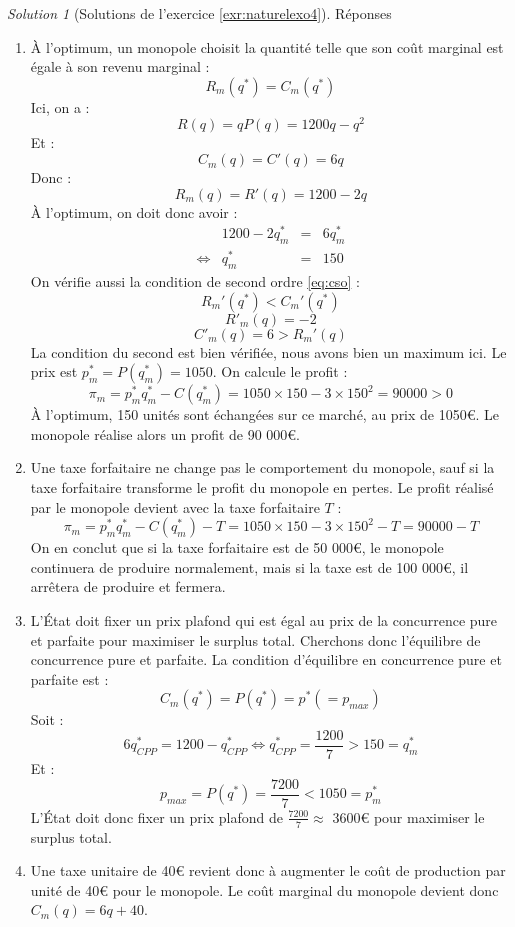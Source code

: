 \documentclass[
]{book}
\providecommand{\tightlist}{%
  \setlength{\itemsep}{0pt}\setlength{\parskip}{0pt}}
\theoremstyle{definition}
\theoremstyle{definition}
\theoremstyle{definition}
\theoremstyle{definition}
\theoremstyle{remark}
\newtheorem*{solution}{Solution}
\begin{document}
\begin{solution}[Solutions de l'exercice \ref{exr:naturelexo4}]

Réponses

\begin{enumerate}
\def\labelenumi{\arabic{enumi}.}
\tightlist
\item
  À l'optimum, un monopole choisit la quantité telle que son coût marginal est égale à son revenu marginal :
  \[R_m(q^*)=C_m(q^*)\]
  Ici, on a :
  \[R(q) =qP(q)=1200q-q^2\]
  Et :
  \[C_m(q)=C'(q)=6q\]
  Donc :
  \[R_m(q)=R'(q)=1200-2q\]
  À l'optimum, on doit donc avoir :
  \[
  \begin{array}{crcl}
  &1200-2q^*_m&=&6q^*_m\\
  \Leftrightarrow & q^*_m&=&150
  \end{array}
  \]
  On vérifie aussi la condition de second ordre \eqref{eq:cso} :
  \[R_m'(q^*)<C_m'(q^*)\]
  \[R'_m(q)=-2\]
  \[C'_m(q)=6>R_m'(q)\]
  La condition du second est bien vérifiée, nous avons bien un maximum ici.
  Le prix est \(p^*_m=P(q^*_m)=1050\).
  On calcule le profit :
  \[\pi_m=p_m^*q_m^*-C(q^*_m)=1050\times150-3\times150^2=90000>0\]
  À l'optimum, 150 unités sont échangées sur ce marché, au prix de 1050€.
  Le monopole réalise alors un profit de 90 000€.
\item
  Une taxe forfaitaire ne change pas le comportement du monopole, sauf si la taxe forfaitaire transforme le profit du monopole en pertes.
  Le profit réalisé par le monopole devient avec la taxe forfaitaire \(T\) :
  \[\pi_m=p_m^*q_m^*-C(q^*_m)-T=1050\times150-3\times150^2-T=90000-T\]
  On en conclut que si la taxe forfaitaire est de 50 000€, le monopole continuera de produire normalement, mais si la taxe est de 100 000€, il arrêtera de produire et fermera.
\item
  L'État doit fixer un prix plafond qui est égal au prix de la concurrence pure et parfaite pour maximiser le surplus total.
  Cherchons donc l'équilibre de concurrence pure et parfaite.
  La condition d'équilibre en concurrence pure et parfaite est :
  \[C_m(q^*)=P(q^*)=p^* (=p_{max})\]
  Soit :
  \[6q^*_{CPP}=1200-q^*_{CPP}\Leftrightarrow q^*_{CPP}=\frac{1200}{7}>150=q_m^*\]
  Et :
  \[p_{max}=P(q^*)=\frac{7200}{7}<1050=p_m^*\]
  L'État doit donc fixer un prix plafond de \(\frac{7200}{7}\approx\) 3600€ pour maximiser le surplus total.
\item
  Une taxe unitaire de 40€ revient donc à augmenter le coût de production par unité de 40€ pour le monopole.
  Le coût marginal du monopole devient donc \(C_m(q)=6q+40\).

\end{enumerate}
\end{solution}
\end{document}
